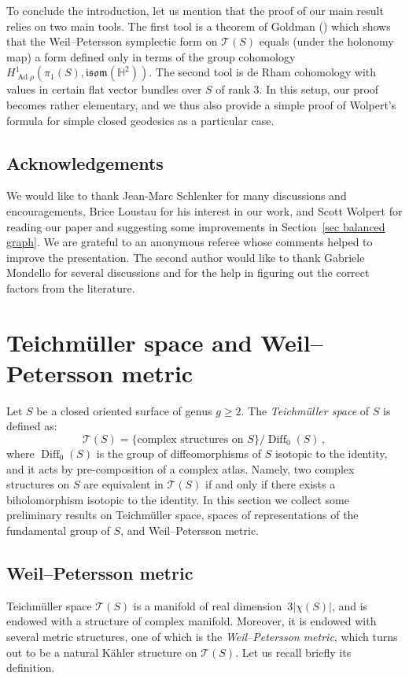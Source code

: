 \documentclass[11pt]{article}
\theoremstyle{definition}
\numberwithin{equation}{section}
\numberwithin{figure}{section}
\numberwithin{table}{section}
\newcommand{\Teich}{\mathcal{T}}
\newcommand{\Hyp}{\mathbb{H}}
\newcommand{\isom}{\mathfrak{isom}}
\DeclareMathOperator{\Diffeo}{Diff}
\DeclareMathOperator{\Ad}{Ad}
\begin{document}
To conclude the introduction, let us mention that the proof of our main result relies on two main tools. The first tool is a theorem of Goldman (\cite{Goldman}) which shows that the Weil--Petersson symplectic form on $\Teich(S)$ equals (under the holonomy map) a form defined only in terms of the group cohomology $H^1_{\Ad\rho}(\pi_1(S),\isom(\Hyp^2))$. The second tool is de Rham cohomology with values in certain flat vector bundles over $S$ of rank $3$. In this setup, our proof becomes rather elementary, and we thus also provide a simple proof of Wolpert's formula for simple closed geodesics as a particular case.

\subsection*{Acknowledgements}
We would like to thank Jean-Marc Schlenker for many discussions and encouragements, Brice Loustau for his interest in our work, and Scott Wolpert for reading our paper and suggesting some improvements in Section~\ref{sec balanced graph}. We are grateful to an anonymous referee whose comments helped to improve the presentation. The second author would like to thank Gabriele Mondello for several discussions and for the help in figuring out the correct factors from the literature.



\section{Teichm\"uller space and Weil--Petersson metric}

Let $S$ be a closed oriented surface of genus $g\geq 2$. The \emph{Teichm\"uller space} of $S$ is defined as:
\[
\Teich (S)=\{\text{complex structures on }S\}/\Diffeo_0(S)\,,
\]
where $\Diffeo_0(S)$ is the group of diffeomorphisms of $S$ isotopic to the identity, and it acts by pre-composition of a complex atlas. Namely, two complex structures on $S$ are equivalent in $\Teich (S)$ if and only if there exists a biholomorphism isotopic to the identity. In this section we collect some preliminary results on Teichm\"uller space, spaces of representations of the fundamental group of $S$, and Weil--Petersson metric.


\subsection{Weil--Petersson metric}

Teichm\"uller space $\Teich(S)$ is a manifold of real dimension~$3|\chi(S)|$, and is endowed with a structure of complex manifold. Moreover, it is endowed with several metric structures, one of which is the \emph{Weil--Petersson metric}, which turns out to be a natural K\"ahler structure on $\Teich(S)$. Let us recall briefly its definition.
\end{document}
